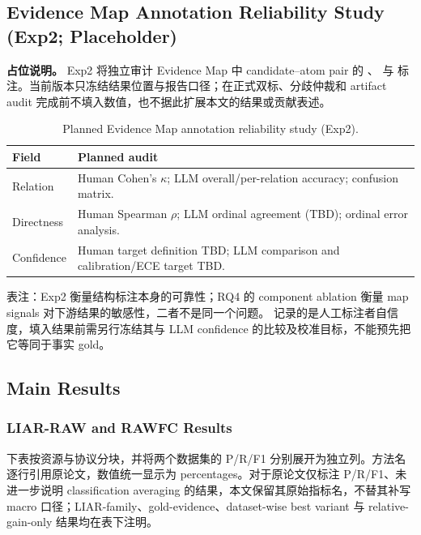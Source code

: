 \documentclass[letterpaper]{article}
\begin{document}
\subsection{Evidence Map Annotation Reliability Study (Exp2; Placeholder)}

\textbf{占位说明。} Exp2 将独立审计 Evidence Map 中 candidate--atom pair 的 \texttt{}、\texttt{} 与 \texttt{} 标注。当前版本只冻结结果位置与报告口径；在正式双标、分歧仲裁和 artifact audit 完成前不填入数值，也不据此扩展本文的结果或贡献表述。

\begin{table}[t]
\centering
\scriptsize
\setlength{\tabcolsep}{2.5pt}
\renewcommand{\arraystretch}{1.08}
\caption{Planned Evidence Map annotation reliability study (Exp2).}
\label{tab:map-reliability-placeholder}
\begin{tabularx}{\columnwidth}{@{}l Y@{}}
\toprule
\textbf{Field} & \textbf{Planned audit} \\
\midrule
Relation & Human Cohen's $\kappa$; LLM overall/per-relation accuracy; confusion matrix. \\
Directness & Human Spearman $\rho$; LLM ordinal agreement (TBD); ordinal error analysis. \\
Confidence & Human target definition TBD; LLM comparison and calibration/ECE target TBD. \\
\bottomrule
\end{tabularx}
\end{table}

表注：Exp2 衡量结构标注本身的可靠性；RQ4 的 component ablation 衡量 map signals 对下游结果的敏感性，二者不是同一个问题。\texttt{} 记录的是人工标注者自信度，填入结果前需另行冻结其与 LLM confidence 的比较及校准目标，不能预先把它等同于事实 gold。

\subsection{Main Results}

\subsubsection{LIAR-RAW and RAWFC Results}

下表按资源与协议分块，并将两个数据集的 P/R/F1 分别展开为独立列。方法名逐行引用原论文，数值统一显示为 percentages。对于原论文仅标注 P/R/F1、未进一步说明 classification averaging 的结果，本文保留其原始指标名，不替其补写 macro 口径；LIAR-family、gold-evidence、dataset-wise best variant 与 relative-gain-only 结果均在表下注明。
\end{document}
